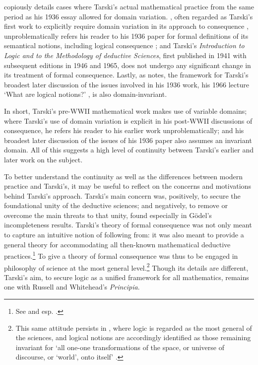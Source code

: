\documentclass[]{article}
\begin{document}
\autocite[251-267]{Gomez-Torrente2009} copiously details cases where Tarski's actual mathematical practice from the same period as his 1936 essay allowed for domain variation. \autocite{Tarski1953a}, often regarded as Tarski's first work to explicitly require domain variation in its approach to consequence \autocite[367]{Corcoran2011} \autocite[65]{Etchemendy1988}, unproblematically refers his reader to his 1936 paper for formal definitions of its semantical notions, including logical consequence \autocite[8, n. 7]{Tarski1953a} \autocite[259]{Gomez-Torrente2009}; and Tarski's  \textit{Introduction to Logic and to the Methodology of deductive Sciences}, first published in 1941 with subsequent editions in 1946 and 1965, does not undergo any significant change in its treatment of formal consequence. Lastly, as \autocite[365-366]{Corcoran2011} notes, the framework for Tarski's broadest later discussion of the issues involved in his 1936 work, his 1966 lecture `What are logical notions?' \autocite{Tarski1986}, is also domain-invariant.

In short, Tarski's pre-WWII mathematical work makes use of variable domains; where Tarski's use of domain variation is explicit in his post-WWII discussions of consequence, he refers his reader to his earlier work unproblematically; and his broadest later discussion of the issues of his 1936 paper also assumes an invariant domain. All of this suggests a high level of continuity between Tarski's earlier and later work on the subject.

To better understand the continuity as well as the differences between modern practice and Tarski's, it may be useful to reflect on the concerns and motivations behind Tarski's approach. Tarski's main concern was, positively, to secure the foundational unity of the deductive sciences; and negatively, to remove or overcome the main threats to that unity, found especially in G\"{o}del's incompleteness results. Tarski's theory of formal consequence was not only meant to capture an intuitive notion of following from: it was also meant to provide a general theory for accommodating all then-known mathematical deductive practices.\footnote{See \autocite{Blok1988} and esp. \autocite{Jane2006}.} To give a theory of formal consequence was thus to be engaged in philosophy of science at the most general level.\footnote{This same attitude persists in \autocite{Tarski1986}, where logic is regarded as the most general of the sciences, and logical notions are accordingly identified as those remaining invariant for `all one-one transformations of the space, or universe of discourse, or `world', onto itself' \autocite[49]{Tarski1986}.} Though its details are different, Tarski's aim, to secure logic as a unified framework for all mathematics, remains one with Russell and Whitehead's \textit{Principia}.
\end{document}
